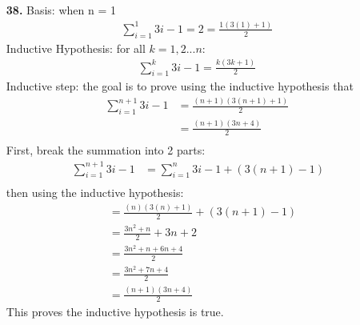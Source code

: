 \documentclass[]{article}
\begin{document}
\begin{flushleft}
\begin{enumerate}
\item[\textbf{38.}]Basis: when n = 1
\begin{align*}
\sum_{i=1}^{1} 3i-1 = 2 = \frac{1(3(1)+1)}{2}\
\end{align*}
Inductive Hypothesis: for all $k=1,2...n$:
\begin{align*}
	\sum_{i=1}^{k} 3i-1 = \frac{k(3k+1)}{2}\
\end{align*}
Inductive step: the goal is to prove using the inductive hypothesis that
\begin{align*}
	\sum_{i=1}^{n+1} 3i-1 &= \frac{(n+1)(3(n+1)+1)}{2}\ \\&= \frac{(n+1)(3n+4)}{2}\ \\
\end{align*}
First, break the summation into 2 parts:
\begin{align*}
	\sum_{i=1}^{n+1} 3i-1 &= \sum_{i=1}^{n} 3i-1 + (3(n+1)-1)\\\
\end{align*}
then using the inductive hypothesis:
\begin{align*}
	&= \frac{(n)(3(n)+1)}{2} + (3(n+1)-1)\\
	&= \frac{3n^2 + n}{2} + 3n + 2\\
	&= \frac{3n^2 + n+6n+4}{2}\\
	&= \frac{3n^2 + 7n +4}{2}\\
	&= \frac{(n+1)(3n+4)}{2}
\end{align*}
This proves the inductive hypothesis is true.


\end{enumerate}
\end{flushleft}
\end{document}
